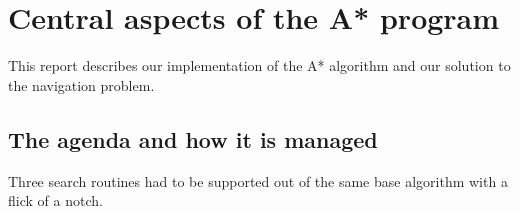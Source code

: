 \section{Central aspects of the A* program}
This report describes our implementation of the A* algorithm and our solution to the navigation problem.

\subsection{The agenda and how it is managed}

Three search routines had to be supported out of the same base algorithm with a flick of a notch.
